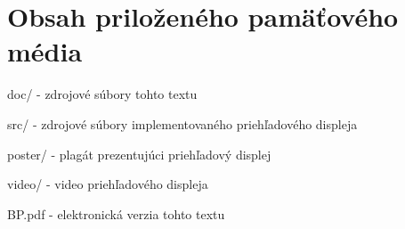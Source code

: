 \chapter{Obsah priloženého pamäťového média}
\begin{DESCRIPTION}
  \item [doc/] - zdrojové súbory tohto textu
  \item [src/] - zdrojové súbory implementovaného priehľadového displeja
  \item [poster/] - plagát prezentujúci priehľadový displej
  \item [video/] - video priehľadového displeja
  \item [BP.pdf] - elektronická verzia tohto textu
\end{DESCRIPTION}